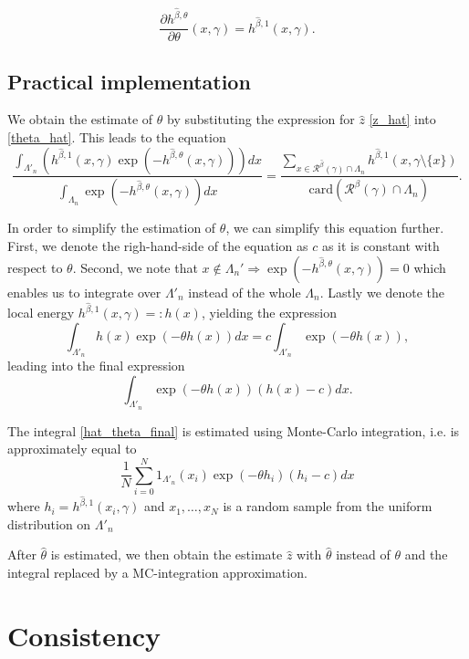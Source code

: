 $$\frac{\partial h^{\hat\beta,\theta}}{\partial \theta} (x,\gamma) = h^{\hat\beta,1}(x,\gamma).$$

\subsection{Practical implementation}
We obtain the estimate of $\theta$ by substituting the expression for $\hat z$ \ref{z_hat} into \ref{theta_hat}.
This leads to the equation
$$ 
\frac{\int_{\Lambda'_n} (h^{\hat\beta,1}(x,\gamma)\exp{\left(-h^{\hat\beta,\theta}(x,\gamma)\right)}) dx} {  \int_{\Lambda_n} \exp{\left( -h^{\hat\beta,\theta}(x,\gamma)\right)} dx} 
= \frac {\sum_{x \in \mathcal R^{\hat\beta}(\gamma)\cap \Lambda_n} h^{\hat\beta,1}(x,\gamma\setminus\{x\})} { \mbox{card}(\mathcal R^\beta(\gamma)\cap \Lambda_n) }. 
$$

In order to simplify the estimation of $\theta$, we can simplify this equation further. First, we denote the righ-hand-side of the equation as $c$ as it  is constant with respect to $\theta$. Second, we note that $x \notin \Lambda_n'  \Rightarrow \exp{\left(-h^{\hat\beta,\theta}(x,\gamma)\right)}= 0$ which enables us to integrate over $\Lambda'_n$ instead of the whole $\Lambda_n$. Lastly we denote the local energy $h^{\hat\beta,1}(x,\gamma) =: h(x)$, yielding the expression
$$ \int_{\Lambda'_n} h(x) \exp{\left(-\theta h(x)\right)} dx = c \int_{\Lambda'_n} \exp{\left(-\theta h(x)\right)}, $$
leading into the final expression
\begin{equation}\label{hat_theta_final} 
\int_{\Lambda'_n} \exp{\left(-\theta h(x)\right)} (h(x) - c) dx .
\end{equation}

The integral \ref{hat_theta_final} is estimated using Monte-Carlo integration, i.e. is approximately equal to
$$ \frac 1N \sum_{i=0}^N 1_{\Lambda'_n}(x_i) \exp{\left( - \theta h_i \right )} (h_i- c) dx $$
where $h_i = h^{\hat\beta,1}(x_i, \gamma)$ and $x_1,\dots,x_N$ is a random sample from the uniform distribution on $\Lambda'_n$

After $\hat\theta$ is estimated, we then obtain the estimate $\hat z$ with $\hat\theta$ instead of $\theta$ and the integral replaced by a MC-integration approximation.


\section{Consistency}
\tbd
